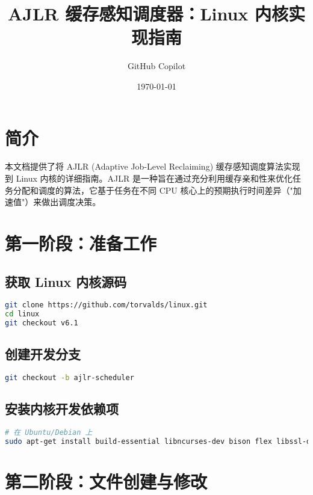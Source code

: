 \documentclass[a4paper,12pt]{article}
\title{AJLR 缓存感知调度器：Linux 内核实现指南}
\author{GitHub Copilot}
\date{\today}
\begin{document}
\maketitle
\tableofcontents
\newpage

\section{简介}

本文档提供了将 AJLR (Adaptive Job-Level Reclaiming) 缓存感知调度算法实现到 Linux 内核的详细指南。AJLR 是一种旨在通过充分利用缓存亲和性来优化任务分配和调度的算法，它基于任务在不同 CPU 核心上的预期执行时间差异（"加速值"）来做出调度决策。

\section{第一阶段：准备工作}

\subsection{获取 Linux 内核源码}

\begin{lstlisting}[language=bash]
git clone https://github.com/torvalds/linux.git
cd linux
git checkout v6.1
\end{lstlisting}

\subsection{创建开发分支}

\begin{lstlisting}[language=bash]
git checkout -b ajlr-scheduler
\end{lstlisting}

\subsection{安装内核开发依赖项}

\begin{lstlisting}[language=bash]
# 在 Ubuntu/Debian 上
sudo apt-get install build-essential libncurses-dev bison flex libssl-dev libelf-dev
\end{lstlisting}

\section{第二阶段：文件创建与修改}
\end{document}
